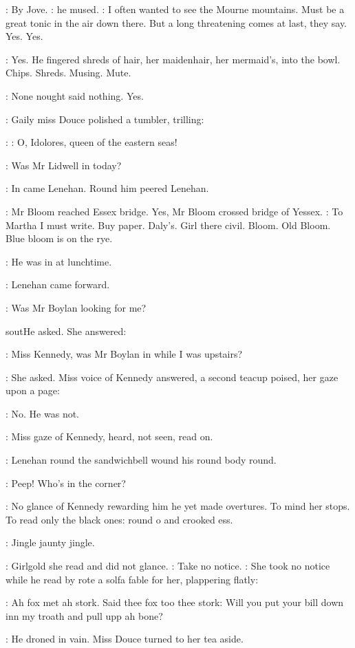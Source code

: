 \Simon:
By Jove.
:
he mused.
\Simon:
I often wanted to see the Mourne mountains. Must be
a great tonic in the air down there.
But a long threatening comes at last,
they say. Yes. Yes.

:
Yes. He fingered shreds of hair, her maidenhair, her mermaid's, into
the bowl. Chips. Shreds. Musing. Mute.

\BloomInt:
None nought said nothing. Yes.

:
Gaily miss Douce polished a tumbler, trilling:

\MissD:
\Song:
O, Idolores, queen of the eastern seas!

\Lenehan:
Was Mr Lidwell in today?

:
In came Lenehan. Round him peered Lenehan.

:
Mr Bloom reached Essex bridge.
Yes, Mr Bloom crossed bridge of Yessex.
\BloomInt:
To Martha I must write. Buy paper.
Daly's. Girl there civil.
Bloom. Old Bloom.
Blue bloom is on the rye.

\MissD:
He was in at lunchtime.

:
Lenehan came forward.

\Lenehan:
Was Mr Boylan looking for me?

sout{He asked. She answered:}

\MissD:
Miss Kennedy, was Mr Boylan in while I was upstairs?

:
She asked. Miss voice of Kennedy answered, a second teacup poised,
her gaze upon a page:

\MissK:
No. He was not.

:
Miss gaze of Kennedy, heard, not seen, read on.

:
Lenehan round the
sandwichbell wound his round body round.

\Lenehan:
Peep! Who's in the corner?

:
No glance of Kennedy rewarding him he yet made overtures. To mind
her stops. To read only the black ones: round o and crooked ess.

:
Jingle jaunty jingle.

:
Girlgold she read and did not glance.
\MissK:
Take no notice.
:
She took no
notice while he read by rote a solfa fable for her, plappering flatly:

\Lenehan:
Ah fox met ah stork. Said thee fox too thee stork: Will you put your
bill down inn my troath and pull upp ah bone?

:
He droned in vain.
Miss Douce turned to her tea aside.

